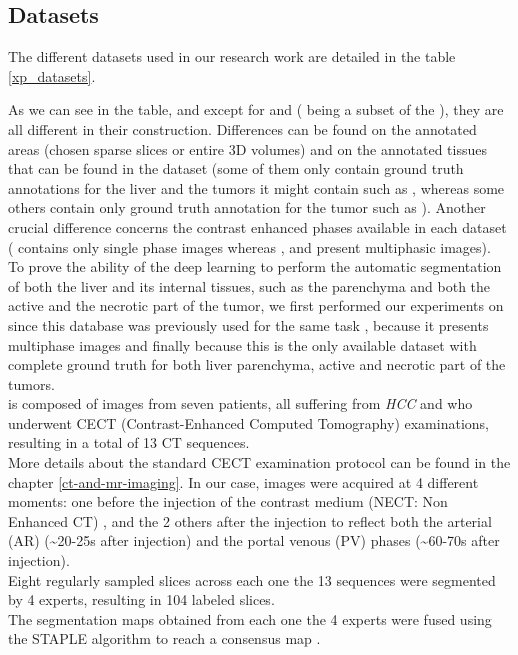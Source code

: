 \subsection{Datasets}

The different datasets used in our research work are detailed in the
table \ref{xp_datasets}.



As we can see in the table, and except for \textbf{} and \textbf{}
(\textbf{} being a subset of the \textbf{} \cite{Bilic2019}), they are all different in their construction. Differences can
be found on the annotated areas (chosen sparse slices or entire 3D
volumes) and on the annotated tissues that can be found in the dataset
(some of them only contain ground truth annotations for the liver and
the tumors it might contain such as \textbf{}, whereas some others contain
only ground truth annotation for the tumor such as \textbf{}). Another
crucial difference concerns the contrast enhanced phases available in
each dataset (\textbf{} contains only single phase images whereas \textbf{},
\textbf{} and \textbf{} present multiphasic images). \\
To prove the ability of the deep learning to perform the automatic
segmentation of both the liver and its internal tissues, such as the
parenchyma and both the active and the necrotic part of the tumor, we
first performed our experiments on \textbf{} since this database was
previously used for the same task \cite{Conze2017}, because it
presents multiphase images and finally because this is the only
available dataset with complete ground truth for both liver parenchyma,
active and necrotic part of the tumors. \\
\textbf{} is composed of images from seven patients, all suffering
from \emph{HCC} and who underwent CECT (Contrast-Enhanced
Computed Tomography) examinations, resulting in a total of 13 CT
sequences. \\
More details about the standard CECT examination protocol can be
found in the chapter \ref{ct-and-mr-imaging}. In our case, images were acquired at 4 different
moments: one before the injection of the contrast medium (NECT:
Non Enhanced CT) , and the 2 others after the injection to reflect both
the arterial (AR) (\textasciitilde{}20-25s after injection) and
the portal venous (PV) phases (\textasciitilde{}60-70s after
injection).\\
Eight regularly sampled slices across each one the 13 sequences were
segmented by 4 experts, resulting in 104 labeled slices. \\
The segmentation maps obtained from each one the 4 experts were fused
using the STAPLE algorithm to reach a consensus map \cite{Warfield2004}.


